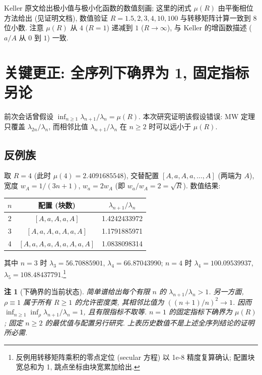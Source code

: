 \documentclass[UTF8]{ctexart}
\newtheorem{remark}[theorem]{注}
\begin{document}
Keller 原文给出极小值与极小化函数的数值刻画; 这里的闭式 $\mu(R)$ 由平衡相位方法给出
(见证明文档), 数值验证 $R = 1.5, 2, 3, 4, 10, 100$ 与转移矩阵计算一致到 8 位小数.
注意 $\mu(R)$ 从 $4$ ($R=1$) 递减到 $1$ ($R \to \infty$), 与 Keller 的增函数描述 ($a/A$ 从 $0$ 到 $1$)
一致.

\section{关键更正: 全序列下确界为 1, 固定指标另论}

前次会话曾假设 $\inf_{n\geq 1} \lambda_{n+1}/\lambda_n = \mu(R)$.
本次研究证明该假设错误: MW 定理只覆盖 $\lambda_{2n}/\lambda_n$, 而相邻比值 $\lambda_{n+1}/\lambda_n$
在 $n \geq 2$ 时可以远小于 $\mu(R)$.

\subsection{反例族}

取 $R = 4$ (此时 $\mu(4) = 2.4091685548$), 交替配置 $[A,a,A,a,\dots,A]$ (两端为 $A$),
宽度 $w_A = 1/(3n+1)$, $w_a = 2w_A$ (即 $w_a/w_A = 2 = \sqrt{R}$). 数值结果:

\begin{center}
\begin{tabular}{ccc}
	\toprule
	$n$ & 配置 (块数) & $\lambda_{n+1}/\lambda_n$ \\
	\midrule
	2 & $[A,a,A,a,A]$ & 1.4242433972 \\
	3 & $[A,a,A,a,A,a,A]$ & 1.1791885971 \\
	4 & $[A,a,A,a,A,a,A,a,A]$ & 1.0838098314 \\
	\bottomrule
\end{tabular}
\end{center}

其中 $n = 3$ 时 $\lambda_3 = 56.70885901$, $\lambda_4 = 66.87043990$; $n = 4$ 时
$\lambda_4 = 100.09539937$, $\lambda_5 = 108.48437791$.\footnote{反例用转移矩阵乘积的零点定位 (secular 方程) 以 1e-8 精度复算确认; 配置块宽总和为 1, 跳点坐标由块宽累加给出.}

\begin{remark}[下确界的当前状态]
简单谱给出每个有限 $n$ 的 $\lambda_{n+1}/\lambda_n>1$.
另一方面, $\rho\equiv1$ 属于所有 $R\ge1$ 的允许密度类,
其相邻比值为 $((n+1)/n)^2\to1$. 因而
$\inf_{n\ge1}\inf_\rho\lambda_{n+1}/\lambda_n=1$, 且有限指标不取等.
$n=1$ 的固定指标下确界为 $\mu(R)$; 固定 $n\ge2$ 的最优值与配置另行研究.
上表历史数值不是上述全序列结论的证明所必需.
\end{remark}
\end{document}
